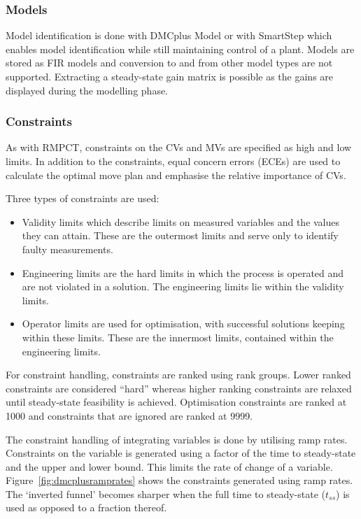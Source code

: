 \subsubsection{Models}
Model identification is done with DMCplus Model or with SmartStep which enables model identification while still maintaining control of a plant.
Models are stored as FIR models and conversion to and from other model types are not supported.
Extracting a steady-state gain matrix is possible as the gains are displayed during the modelling phase.

\subsubsection{Constraints}\label{sec:dmcpluscons}
As with RMPCT, constraints on the CVs and MVs are specified as high and low limits.
In addition to the constraints, equal concern errors (ECEs) are used to calculate the optimal move plan and emphasise the relative importance of CVs.

Three types of constraints are used:
\begin{itemize}
\item Validity limits which describe limits on measured variables and the values they can attain.
These are the outermost limits and serve only to identify faulty measurements.
\item Engineering limits are the hard limits in which the process is operated and are not violated in a solution.
The engineering limits lie within the validity limits.
\item Operator limits are used for optimisation, with successful solutions keeping within these limits.
These are the innermost limits, contained within the engineering limits.
\end{itemize}

For constraint handling, constraints are ranked using rank groups.
Lower ranked constraints are considered ``hard'' whereas higher ranking constraints are relaxed until steady-state feasibility is achieved.
Optimisation constraints are ranked at 1000 and constraints that are ignored are ranked at 9999.

The constraint handling of integrating variables is done by utilising ramp rates.
Constraints on the variable is generated using a factor of the time to steady-state and the upper and lower bound.
This limits the rate of change of a variable.
Figure~\ref{fig:dmcplusramprates} shows the constraints generated using ramp rates.
The `inverted funnel' becomes sharper when the full time to steady-state ($t_{ss}$) is used as opposed to a fraction thereof.

